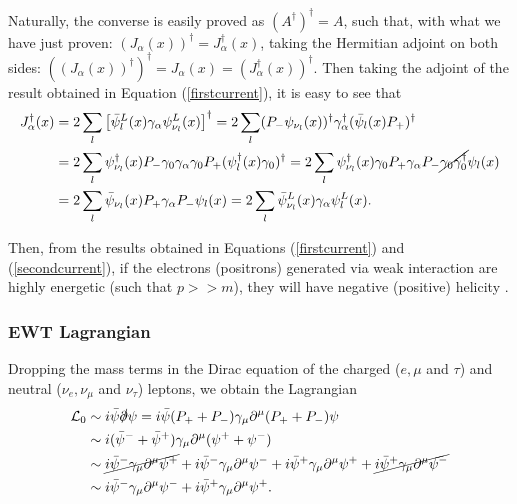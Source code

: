 Naturally, the converse is easily proved as $(A^{\dagger})^{\dagger} = A$, such that, with what we have just proven: $(J_{\alpha}(x))^{\dagger} = J^{\dagger}_{\alpha}(x)$, taking the Hermitian adjoint on both sides: $((J_{\alpha}(x))^{\dagger})^{\dagger} = J_{\alpha}(x) = (J^{\dagger}_{\alpha}(x))^{\dagger}$. Then taking the adjoint of the result obtained in Equation (\ref{firstcurrent}), it is easy to see that
\begin{align}
    J_{\alpha}^{\dagger}(x) &= 2\sum_l \left[\Bar{\psi}^L_l(x)\gamma_{\alpha}\psi^L_{\nu_l}(x)\right]^{\dagger} = 2\sum_l (P_-\psi_{\nu_l}(x))^{\dagger}\gamma_{\alpha}^{\dagger}(\Bar{\psi}_l(x)P_+)^{\dagger} \nonumber \\
    &= 2\sum_l \psi_{\nu_l}^{\dagger}(x)P_-\gamma_0\gamma_{\alpha}\gamma_0P_+ (\psi^{\dagger}_l(x)\gamma_0)^{\dagger} = 2\sum_l \psi_{\nu_l}^{\dagger}(x)\gamma_0P_+\gamma_{\alpha}P_-\cancel{\gamma_0\gamma_0^{\dagger}}\psi_l(x) \nonumber \\
\label{secondcurrent}
    &= 2\sum_l \Bar{\psi}_{\nu_l}(x)P_+\gamma_{\alpha}P_-\psi_l(x) = 2\sum_l \Bar{\psi}_{\nu_l}^L(x)\gamma_{\alpha}\psi_l^L(x).
\end{align}

Then, from the results obtained in Equations (\ref{firstcurrent}) and (\ref{secondcurrent}), if the electrons (positrons) generated via weak interaction are highly energetic (such that $p >> m$), they will have negative (positive) helicity \cite{Mandl}.

\subsubsection{EWT Lagrangian}

Dropping the mass terms in the Dirac equation of the charged ($e, \mu$ and $\tau$) and neutral ($\nu_e, \nu_{\mu}$ and $\nu_{\tau}$) leptons, we obtain the Lagrangian
\begin{align*}
    \mathcal{L}_0 &\sim i\Bar{\psi}\slashed{\partial}\psi = i\Bar{\psi} (P_+ + P_-) \gamma_{\mu}\partial^{\mu} (P_+ + P_-) \psi \\
    &\sim i(\Bar{\psi}^- + \Bar{\psi}^+)\gamma_{\mu}\partial^{\mu}(\psi^+ + \psi^-) \\
    &\sim \cancel{i\Bar{\psi}^-\gamma_{\mu}\partial^{\mu}\psi^+} + i\Bar{\psi}^-\gamma_{\mu}\partial^{\mu}\psi^- + i\Bar{\psi}^+\gamma_{\mu}\partial^{\mu}\psi^+ + \cancel{i\Bar{\psi}^+\gamma_{\mu}\partial^{\mu}\psi^-} \\
    &\sim i\Bar{\psi}^-\gamma_{\mu}\partial^{\mu}\psi^- + i\Bar{\psi}^+\gamma_{\mu}\partial^{\mu}\psi^+.
\end{align*}

